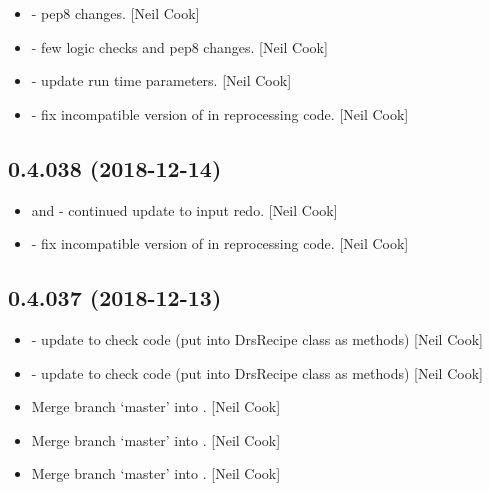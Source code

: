 \documentclass[a4paper,10pt,english]{report}
\begin{document}
\begin{itemize}
\item {} 
 - pep8 changes. {[}Neil Cook{]}

\item {} 
 - few logic checks and pep8 changes. {[}Neil
Cook{]}

\item {} 
 - update run time parameters. {[}Neil Cook{]}

\item {} 
 - fix incompatible version of  in
reprocessing code. {[}Neil Cook{]}

\end{itemize}


\subsection{0.4.038 (2018-12-14)}
\label{\detokenize{misc/changelog:id234}}\begin{itemize}
\item {} 
 and  - continued update to input
redo. {[}Neil Cook{]}

\item {} 
 - fix incompatible version of  in
reprocessing code. {[}Neil Cook{]}

\end{itemize}


\subsection{0.4.037 (2018-12-13)}
\label{\detokenize{misc/changelog:id235}}\begin{itemize}
\item {} 
 - update to check code (put into DrsRecipe class as
methods) {[}Neil Cook{]}

\item {} 
 - update to check code (put into DrsRecipe class as
methods) {[}Neil Cook{]}

\item {} 
Merge branch ‘master’ into . {[}Neil Cook{]}

\item {} 
Merge branch ‘master’ into . {[}Neil Cook{]}

\item {} 
Merge branch ‘master’ into . {[}Neil Cook{]}

\end{itemize}
\end{document}
